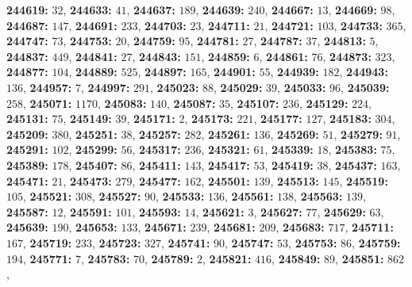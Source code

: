 \textsf{\bfseries 244619:} $32$, \textsf{\bfseries 244633:} $41$, \textsf{\bfseries 244637:} $189$, \textsf{\bfseries 244639:} $240$, \textsf{\bfseries 244667:} $13$, \textsf{\bfseries 244669:} $98$, \textsf{\bfseries 244687:} $147$, \textsf{\bfseries 244691:} $233$, \textsf{\bfseries 244703:} $23$, \textsf{\bfseries 244711:} $21$, \textsf{\bfseries 244721:} $103$, \textsf{\bfseries 244733:} $365$, \textsf{\bfseries 244747:} $73$, \textsf{\bfseries 244753:} $20$, \textsf{\bfseries 244759:} $95$, \textsf{\bfseries 244781:} $27$, \textsf{\bfseries 244787:} $37$, \textsf{\bfseries 244813:} $5$, \textsf{\bfseries 244837:} $449$, \textsf{\bfseries 244841:} $27$, \textsf{\bfseries 244843:} $151$, \textsf{\bfseries 244859:} $6$, \textsf{\bfseries 244861:} $76$, \textsf{\bfseries 244873:} $323$, \textsf{\bfseries 244877:} $104$, \textsf{\bfseries 244889:} $525$, \textsf{\bfseries 244897:} $165$, \textsf{\bfseries 244901:} $55$, \textsf{\bfseries 244939:} $182$, \textsf{\bfseries 244943:} $136$, \textsf{\bfseries 244957:} $7$, \textsf{\bfseries 244997:} $291$, \textsf{\bfseries 245023:} $88$, \textsf{\bfseries 245029:} $39$, \textsf{\bfseries 245033:} $96$, \textsf{\bfseries 245039:} $258$, \textsf{\bfseries 245071:} $1170$, \textsf{\bfseries 245083:} $140$, \textsf{\bfseries 245087:} $35$, \textsf{\bfseries 245107:} $236$, \textsf{\bfseries 245129:} $224$, \textsf{\bfseries 245131:} $75$, \textsf{\bfseries 245149:} $39$, \textsf{\bfseries 245171:} $2$, \textsf{\bfseries 245173:} $221$, \textsf{\bfseries 245177:} $127$, \textsf{\bfseries 245183:} $304$, \textsf{\bfseries 245209:} $380$, \textsf{\bfseries 245251:} $38$, \textsf{\bfseries 245257:} $282$, \textsf{\bfseries 245261:} $136$, \textsf{\bfseries 245269:} $51$, \textsf{\bfseries 245279:} $91$, \textsf{\bfseries 245291:} $102$, \textsf{\bfseries 245299:} $56$, \textsf{\bfseries 245317:} $236$, \textsf{\bfseries 245321:} $61$, \textsf{\bfseries 245339:} $18$, \textsf{\bfseries 245383:} $75$, \textsf{\bfseries 245389:} $178$, \textsf{\bfseries 245407:} $86$, \textsf{\bfseries 245411:} $143$, \textsf{\bfseries 245417:} $53$, \textsf{\bfseries 245419:} $38$, \textsf{\bfseries 245437:} $163$, \textsf{\bfseries 245471:} $21$, \textsf{\bfseries 245473:} $279$, \textsf{\bfseries 245477:} $162$, \textsf{\bfseries 245501:} $139$, \textsf{\bfseries 245513:} $145$, \textsf{\bfseries 245519:} $105$, \textsf{\bfseries 245521:} $308$, \textsf{\bfseries 245527:} $90$, \textsf{\bfseries 245533:} $136$, \textsf{\bfseries 245561:} $138$, \textsf{\bfseries 245563:} $139$, \textsf{\bfseries 245587:} $12$, \textsf{\bfseries 245591:} $101$, \textsf{\bfseries 245593:} $14$, \textsf{\bfseries 245621:} $3$, \textsf{\bfseries 245627:} $77$, \textsf{\bfseries 245629:} $63$, \textsf{\bfseries 245639:} $190$, \textsf{\bfseries 245653:} $133$, \textsf{\bfseries 245671:} $239$, \textsf{\bfseries 245681:} $209$, \textsf{\bfseries 245683:} $717$, \textsf{\bfseries 245711:} $167$, \textsf{\bfseries 245719:} $233$, \textsf{\bfseries 245723:} $327$, \textsf{\bfseries 245741:} $90$, \textsf{\bfseries 245747:} $53$, \textsf{\bfseries 245753:} $86$, \textsf{\bfseries 245759:} $194$, \textsf{\bfseries 245771:} $7$, \textsf{\bfseries 245783:} $70$, \textsf{\bfseries 245789:} $2$, \textsf{\bfseries 245821:} $416$, \textsf{\bfseries 245849:} $89$, \textsf{\bfseries 245851:} $862$, 
